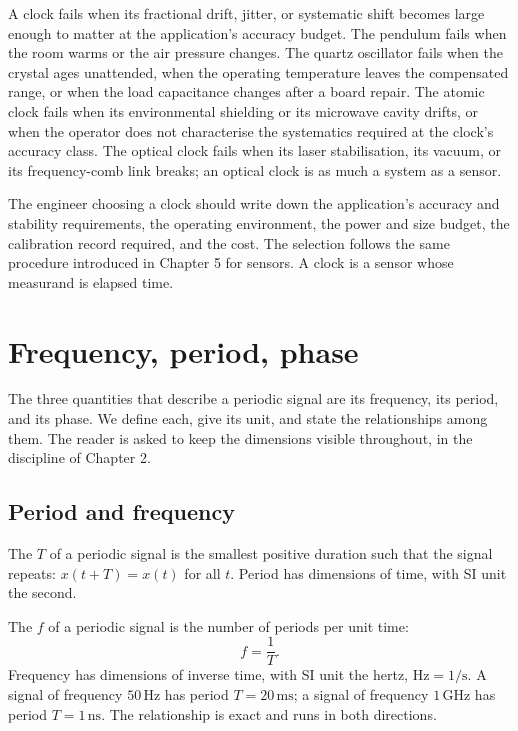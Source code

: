 A clock fails when its fractional drift, jitter, or systematic shift
becomes large enough to matter at the application's accuracy
budget. The pendulum fails when the room warms or the air pressure
changes. The quartz oscillator fails when the crystal ages
unattended, when the operating temperature leaves the compensated
range, or when the load capacitance changes after a board repair.
The atomic clock fails when its environmental shielding or its
microwave cavity drifts, or when the operator does not characterise
the systematics required at the clock's accuracy class. The optical
clock fails when its laser stabilisation, its vacuum, or its
frequency-comb link breaks; an optical clock is as much a system as
a sensor.

The engineer choosing a clock should write down the application's
accuracy and stability requirements, the operating environment, the
power and size budget, the calibration record required, and the
cost. The selection follows the same procedure introduced in
Chapter 5 for sensors. A clock is a sensor whose measurand is
elapsed time.

\section{Frequency, period, phase}

The three quantities that describe a periodic signal are its
frequency, its period, and its phase. We define each, give its unit,
and state the relationships among them. The reader is asked to keep
the dimensions visible throughout, in the discipline of Chapter 2.

\subsection{Period and frequency}

The  $T$ of a periodic signal is the smallest
positive duration such that the signal repeats: $x(t + T) = x(t)$
for all $t$. Period has dimensions of time, with SI unit the second.

The  $f$ of a periodic signal is the number of
periods per unit time:
\[
f = \frac{1}{T}.
\]
Frequency has dimensions of inverse time, with SI unit the hertz,
$\si{\hertz} = 1/\si{\second}$. A signal of frequency $50 \,\si
{\hertz}$ has period $T = 20 \,\si{\milli\second}$; a signal of
frequency $1 \,\si{\giga\hertz}$ has period $T = 1 \,\si{\nano
\second}$. The relationship is exact and runs in both directions.

